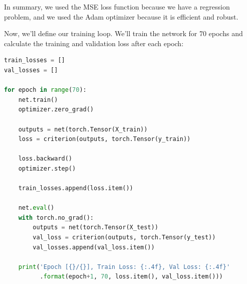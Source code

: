 In summary, we used the MSE loss function because we have a regression
problem, and we used the Adam optimizer because it is efficient and
robust. \newline

Now, we'll define our training loop. We'll train the network for 70
epochs and calculate the training and validation loss after each epoch:

\begin{lstlisting}[language=Python]
train_losses = []
val_losses = []

for epoch in range(70):
    net.train()
    optimizer.zero_grad()

    outputs = net(torch.Tensor(X_train))
    loss = criterion(outputs, torch.Tensor(y_train))

    loss.backward()
    optimizer.step()

    train_losses.append(loss.item())

    net.eval()
    with torch.no_grad():
        outputs = net(torch.Tensor(X_test))
        val_loss = criterion(outputs, torch.Tensor(y_test))
        val_losses.append(val_loss.item())

    print('Epoch [{}/{}], Train Loss: {:.4f}, Val Loss: {:.4f}'
          .format(epoch+1, 70, loss.item(), val_loss.item()))
\end{lstlisting}

